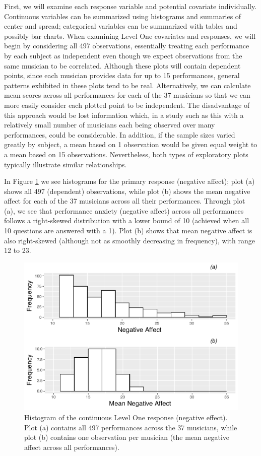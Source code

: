 \documentclass[
]{krantz}
\begin{document}
First, we will examine each response variable and potential covariate individually. Continuous variables can be summarized using histograms and summaries of center and spread; categorical variables can be summarized with tables and possibly bar charts. When examining Level One covariates and responses, we will begin by considering all 497 observations, essentially treating each performance by each subject as independent even though we expect observations from the same musician to be correlated. Although these plots will contain dependent points, since each musician provides data for up to 15 performances, general patterns exhibited in these plots tend to be real. Alternatively, we can calculate mean scores across all performances for each of the 37 musicians so that we can more easily consider each plotted point to be independent. The disadvantage of this approach would be lost information which, in a study such as this with a relatively small number of musicians each being observed over many performances, could be considerable. In addition, if the sample sizes varied greatly by subject, a mean based on 1 observation would be given equal weight to a mean based on 15 observations. Nevertheless, both types of exploratory plots typically illustrate similar relationships.

In Figure \ref{fig:mli-hist1} we see histograms for the primary response (negative affect); plot (a) shows all 497 (dependent) observations, while plot (b) shows the mean negative affect for each of the 37 musicians across all their performances. Through plot (a), we see that performance anxiety (negative affect) across all performances follows a right-skewed distribution with a lower bound of 10 (achieved when all 10 questions are answered with a 1). Plot (b) shows that mean negative affect is also right-skewed (although not as smoothly decreasing in frequency), with range 12 to 23.

\begin{figure}

{\centering \includegraphics[width=0.6\linewidth]{bookdown-BeyondMLR_files/figure-latex/mli-hist1-1} 

}

\caption{Histogram of the continuous Level One response (negative effect). Plot (a) contains all 497 performances across the 37 musicians, while plot (b) contains one observation per musician (the mean negative affect across all performances).}\label{fig:mli-hist1}
\end{figure}
\end{document}
